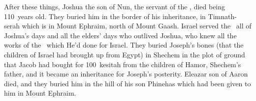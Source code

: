 \begin{inparaenum}
   After these things, Joshua the son of Nun, the servant of the \lord, died being 110~years old.%
   They buried him in the border of his inheritance, in Timnath-serah which is in Mount Ephraim, north of Mount Gaash.%
   Israel served the \lord\ all of Joshua's days and all the elders' days who outlived Joshua, who knew all the works of the \lord\ which He'd done for Israel.%
   They buried Joseph's bones (that the children of Israel had brought up from Egypt) in Shechem in the plot of ground that Jacob had bought for 100~kesitah from the children of Hamor, Shechem's father, and it became an inheritance for Joseph's posterity.%
   Eleazar son of Aaron died, and they buried him in the hill of his son Phinehas which had been given to him in Mount Ephraim.%
\end{inparaenum}
